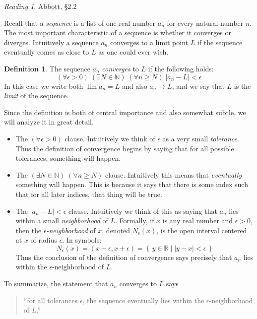 \documentclass[11pt,oneside]{amsbook}
\newcommand{\set}[1]{\left\{\,#1\,\right\}}
\newcommand{\N}{\mathbb N}
\newcommand{\R}{\mathbb R}
\theoremstyle{definition}
\theoremstyle{plain}
\theoremstyle{definition}
\newtheorem{definition}[theorem]{Definition}
\theoremstyle{remark}
\newtheorem*{reading}{Reading}
\numberwithin{equation}{section}
\numberwithin{figure}{section}
\begin{document}
\begin{reading}
  Abbott, \S 2.2
\end{reading}

Recall that a \emph{sequence} is a list of one real number $a_n$ for every natural number $n$. The most important characteristic of a sequence is whether it converges or diverges. Intuitively a sequence $a_n$ converges to a limit point $L$ if the sequence eventually comes as close to $L$ as one could ever wish.

\begin{definition}
  The sequence $a_n$ \emph{converges} to $L$ if the following holds:
  \[(\forall\epsilon>0)\;(\exists N\in\N)\;(\forall n\geq N)\;|a_n-L|<\epsilon
  \]
  In this case we write both $\lim a_n=L$ and also $a_n\to L$, and we say that $L$ is the \emph{limit} of the sequence.
\end{definition}

Since the definition is both of central importance and also somewhat subtle, we will analyze it in great detail.

\begin{itemize}
\item The $(\forall\epsilon>0)$ clause. Intuitively we think of $\epsilon$ as a very small \emph{tolerance}. Thus the definition of convergence begins by saying that for all possible tolerances, something will happen.
\item The $(\exists N\in\N)\;(\forall n\geq N)$ clause. Intuitively this means that \emph{eventually} something will happen. This is because it says that there is some index such that for all later indices, that thing will be true.
\item The $|a_n-L|<\epsilon$ clause. Intuitively we think of this as saying that $a_n$ lies within a small \emph{neighborhood} of $L$. Formally, if $x$ is any real number and $\epsilon>0$, then the \emph{$\epsilon$-neighborhood} of $x$, denoted $N_\epsilon(x)$, is the open interval centered at $x$ of radius $\epsilon$. In symbols:
  \[N_\epsilon(x)=(x-\epsilon,x+\epsilon)=\set{y\in\R\mid|y-x|<\epsilon}
  \]
  Thus the conclusion of the definition of convergence says precisely that $a_n$ lies within the $\epsilon$-neighborhood of $L$.
\end{itemize}

To summarize, the statement that $a_n$ converges to $L$ says
\begin{quotation}
 ``for all tolerances $\epsilon$, the sequence eventually lies within the $\epsilon$-neighborhood of $L$.''
\end{quotation}
\end{document}
